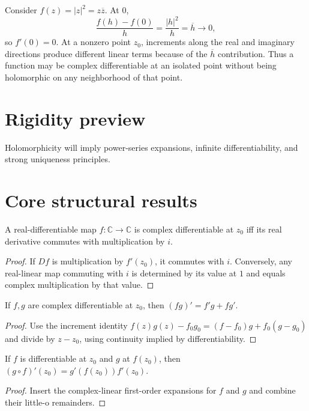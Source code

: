 \begin{example}\label{ex:iv01-expand-03}
Consider \(f(z)=|z|^2=z\overline z\). At \(0\),
\[
\frac{f(h)-f(0)}{h}=\frac{|h|^2}{h}=\overline h\longrightarrow0,
\]
so \(f'(0)=0\). At a nonzero point \(z_0\), increments along the real and imaginary directions produce different linear terms because of the \(\overline h\) contribution. Thus a function may be complex differentiable at an isolated point without being holomorphic on any neighborhood of that point.
\end{example}
\section{Rigidity preview}
Holomorphicity will imply power-series expansions, infinite differentiability, and strong uniqueness principles.

\section{Core structural results}

\begin{theorem}\label{thm:iv01-01}
A real-differentiable map $f:\mathbb C\to\mathbb C$ is complex differentiable at $z_0$ iff its real derivative commutes with multiplication by $i$.
\begin{proof}
If $Df$ is multiplication by $f'(z_0)$, it commutes with $i$. Conversely, any real-linear map commuting with $i$ is determined by its value at $1$ and equals complex multiplication by that value.
\end{proof}
\end{theorem}

\begin{theorem}\label{thm:iv01-02}
If $f,g$ are complex differentiable at $z_0$, then $(fg)'=f'g+fg'$.
\begin{proof}
Use the increment identity $f(z)g(z)-f_0g_0=(f-f_0)g+f_0(g-g_0)$ and divide by $z-z_0$, using continuity implied by differentiability.
\end{proof}
\end{theorem}

\begin{theorem}\label{thm:iv01-03}
If $f$ is differentiable at $z_0$ and $g$ at $f(z_0)$, then $(g\circ f)'(z_0)=g'(f(z_0))f'(z_0)$.
\begin{proof}
Insert the complex-linear first-order expansions for $f$ and $g$ and combine their little-o remainders.
\end{proof}
\end{theorem}

